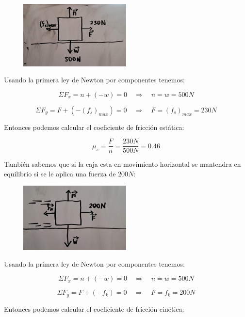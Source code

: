 \documentclass{article}
\begin{document}
    \begin{figure}[H]
        \centering
        \includegraphics[width=0.5\textwidth]{img/3.3-3.png}
    \end{figure}

    \par Usando la primera ley de Newton por componentes tenemos:

    \[ \Sigma F_x = n + (-w) = 0 \quad \Longrightarrow \quad n = w = 500N \]

    \[ \Sigma F_y = F + (-(f_s)_{max}) = 0 \quad \Longrightarrow \quad F = (f_s)_{max} = 230N \]

    \par Entonces podemos calcular el coeficiente de fricción estática:

    \[ \mu_s = \frac{F}{n} = \frac{230N}{500N} = 0.46 \]

    \par También sabemos que si la caja esta en movimiento horizontal se mantendra en equilibrio si se le aplica una fuerza de $200N$:

    \begin{figure}[H]
        \centering
        \includegraphics[width=0.5\textwidth]{img/3.3-4.png}
    \end{figure}

    \par Usando la primera ley de Newton por componentes tenemos:

    \[ \Sigma F_x = n + (-w) = 0 \quad \Longrightarrow \quad n = w = 500N \]

    \[ \Sigma F_y = F + (-f_k) = 0 \quad \Longrightarrow \quad F = f_k = 200N \]

    \par Entonces podemos calcular el coeficiente de fricción cinética:
\end{document}
